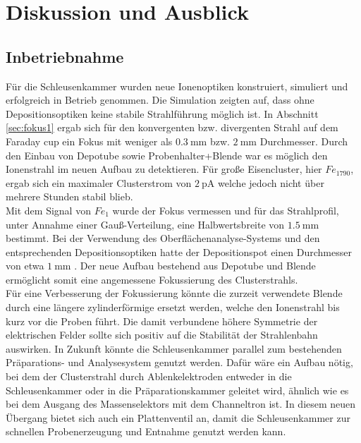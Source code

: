 \chapter{Diskussion und Ausblick}
\section{Inbetriebnahme}
Für die Schleusenkammer wurden neue Ionenoptiken konstruiert, simuliert und erfolgreich in Betrieb genommen.
Die Simulation zeigten auf, dass ohne Depositionsoptiken keine stabile Strahlführung möglich ist.
In Abschnitt \ref{sec:fokus1} ergab sich für den konvergenten bzw. divergenten Strahl auf dem Faraday cup ein Fokus mit weniger als $\SI{0,3}{\mm}$ bzw. $\SI{2}{\mm}$ Durchmesser.
Durch den Einbau von Depotube sowie Probenhalter+Blende war es möglich den Ionenstrahl im neuen Aufbau zu detektieren.
Für große Eisencluster, hier $Fe_{1790}$, ergab sich ein maximaler Clusterstrom von $\SI{2}{\pA}$ welche jedoch nicht über mehrere Stunden stabil blieb.\\
Mit dem Signal von $Fe_1$ wurde der Fokus vermessen und für das Strahlprofil, unter Annahme einer Gauß-Verteilung, eine Halbwertsbreite von $\SI{1,5}{\milli\meter}$ bestimmt.
Bei der Verwendung des Oberflächenanalyse-Systems und den entsprechenden Depositionsoptiken hatte der Depositionspot einen Durchmesser von etwa $\SI{1}{\mm}$ \cite[S. 40]{gronhagen}.
Der neue Aufbau bestehend aus Depotube und Blende ermöglicht somit eine angemessene Fokussierung des Clusterstrahls.\\

Für eine Verbesserung der Fokussierung könnte die zurzeit verwendete Blende durch eine längere zylinderförmige ersetzt werden, welche den Ionenstrahl bis kurz vor die Proben führt. 
Die damit verbundene höhere Symmetrie der elektrischen Felder sollte sich positiv auf die Stabilität der Strahlenbahn auswirken.
In Zukunft könnte die Schleusenkammer parallel zum bestehenden Präparations- und Analysesystem genutzt werden.
Dafür wäre ein Aufbau nötig, bei dem der Clusterstrahl durch Ablenkelektroden entweder in die Schleusenkammer oder in die Präparationskammer geleitet wird, ähnlich wie es bei dem Ausgang des Massenselektors mit dem Channeltron ist.
In diesem neuen Übergang bietet sich auch ein Plattenventil an, damit die Schleusenkammer zur schnellen Probenerzeugung und Entnahme genutzt werden kann.


